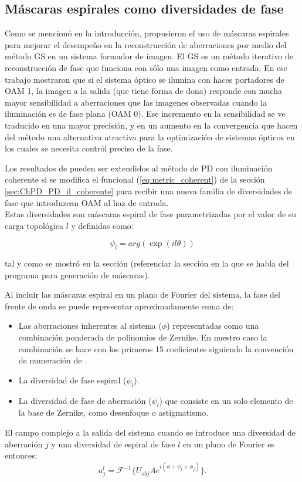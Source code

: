 \subsection{Máscaras espirales como diversidades de fase}
\label{sec:ChPD_PD_Spiral_Diversity}
Como se mencionó en la introducción, 
propusieron el uso de máscaras espirales para mejorar el desempeño en
la reconstrucción de aberraciones por medio del método GS en un
sistema formador de imagen. El GS es un método iterativo de
reconstrucción de fase que funciona con sólo una imagen como
entrada. En ese trabajo mostraron que si el sistema
óptico se ilumina con haces portadores de OAM 1, la imagen a la salida
(que tiene forma de dona) responde con mucha mayor sensibilidad a aberraciones que las
imagenes observadas cuando la iluminación es de fase plana (OAM 0). Ese
incremento en la sensibilidad se ve traducido en una mayor
precisión, y en un aumento en la convergencia que hacen del método una alternativa
atractiva para la optimización de sistemas ópticos en los cuales se
necesita contról preciso de la fase. 

Los resultados de  pueden ser extendidos al
método de PD con iluminación coherente si se modifica el funcional (\ref{eq:metric_coherent}) de la
sección \ref{sec:ChPD_PD_il_coherente} para recibir una nueva familia de
diversidades de fase que introduzcan OAM al haz de entrada. \\
Estas diversidades son máscaras espiral de fase parametrizadas por el
valor de su carga topológica $l$ y definidas como:

$$\psi_l = arg(\exp{(il \theta)})$$

tal y como se mostró en la sección (referenciar la sección en la que
se habla del programa para generación de máscaras). 

Al incluir las máscaras espiral en un plano de Fourier del sistema, la fase del frente de
onda se puede representar aproximadamente suma de:
\begin{itemize}
\item Las aberraciones inherentes al sistema ($\phi$) representadas como una
  combinación ponderada de polinomios de Zernike. En nuestro caso la
  combinación se hace con los primeros 15 coeficientes siguiendo la
  convención de numeración de . 
\item La diversidad de fase espiral ($\psi_l$).
\item La diversidad de fase de aberración ($\psi_l$) que consiste en
  un solo elemento de la base de Zernike, como desenfoque o
  astigmatismo. 
\end{itemize}
El campo complejo a la salida del sistema cuando se introduce una diversidad de
aberración $j$ y una diversidad de espiral de fase $l$ en un plano de
Fourier es entonces:
\begin{equation}\label{eq:newGP}
 u_j^l =  \mathcal{F}^{- 1}\{U_{obj} A e^{i\left(
     \phi+ \psi_l + \phi_j \right)} \}.
\end{equation}

